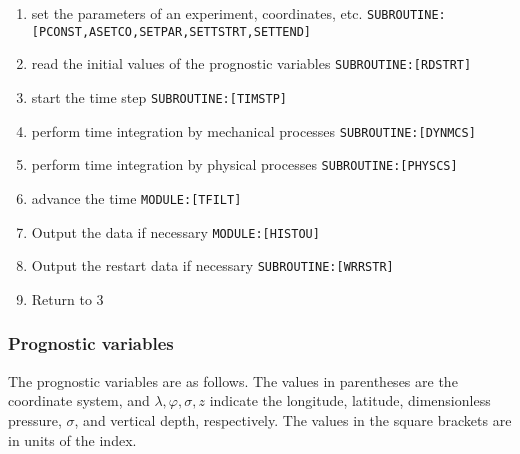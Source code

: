 \begin{enumerate}
\def\labelenumi{\arabic{enumi}.}
\item
  set the parameters of an experiment, coordinates, etc.
  \texttt{SUBROUTINE:{[}PCONST,ASETCO,SETPAR,SETTSTRT,SETTEND{]}}
\item
  read the initial values of the prognostic variables
  \texttt{SUBROUTINE:{[}RDSTRT{]}}
\item
  start the time step \texttt{SUBROUTINE:{[}TIMSTP{]}}
\item
  perform time integration by mechanical processes
  \texttt{SUBROUTINE:{[}DYNMCS{]}}
\item
  perform time integration by physical processes
  \texttt{SUBROUTINE:{[}PHYSCS{]}}
\item
  advance the time \texttt{MODULE:{[}TFILT{]}}
\item
  Output the data if necessary \texttt{MODULE:{[}HISTOU{]}}
\item
  Output the restart data if necessary \texttt{SUBROUTINE:{[}WRRSTR{]}}
\item
  Return to 3
\end{enumerate}

\hypertarget{prognostic-variables}{%
\subsubsection{Prognostic variables}\label{prognostic-variables}}

The prognostic variables are as follows. The values in parentheses are
the coordinate system, and \(\lambda,\varphi,\sigma, z\) indicate the
longitude, latitude, dimensionless pressure, \(\sigma\), and vertical
depth, respectively. The values in the square brackets are in units of
the index.

